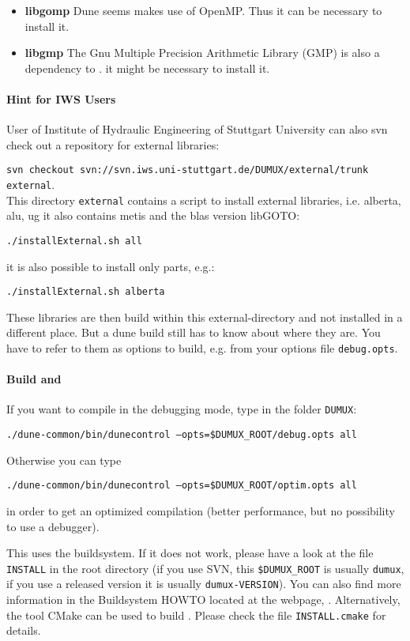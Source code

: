 \begin{itemize}
\item \textbf{libgomp} Dune seems makes use of OpenMP. Thus it can be necessary to install it.

\item \textbf{libgmp} The Gnu Multiple Precision Arithmetic Library (GMP) is also a dependency to \Dune. it might be necessary to install it.

\end{itemize}

\paragraph{Hint for IWS Users} User of Institute of Hydraulic Engineering of Stuttgart University 
can also svn check out a repository for external libraries: 

\texttt{svn checkout svn://svn.iws.uni-stuttgart.de/DUMUX/external/trunk external}. \\

This directory \texttt{external} contains a script to install external libraries, i.e. 
alberta, alu, ug it also contains metis and the blas version libGOTO: 
\begin{center}
\texttt{./installExternal.sh all}
\end{center}
it is also possible to install only parts, e.g.:\\ 
\begin{center}
\texttt{./installExternal.sh alberta}
\end{center}

These libraries are then build within this external-directory and not installed in 
a different place. But a dune build still  has to know about where they are.
You have to refer to them as options to \Dune build, e.g. from your options file \texttt{debug.opts}.


\paragraph{Build \Dune and \Dumux}
\label{buildIt}
If you want to compile in the debugging mode, type in the folder \texttt{DUMUX}: 
\begin{center}
\texttt{./dune-common/bin/dunecontrol --opts=\$DUMUX\_ROOT/debug.opts all}
\end{center}

Otherwise you can type
\begin{center}
\texttt{./dune-common/bin/dunecontrol --opts=\$DUMUX\_ROOT/optim.opts all}
\end{center}
in order to get an optimized compilation (better performance, but no possibility to use a debugger).

This uses the \Dune buildsystem. If it does not work, please have a look at the file \texttt{INSTALL} in the \Dumux root directory (if you use SVN, this \texttt{\$DUMUX\_ROOT} is usually \texttt{dumux}, if you use a released version it is usually \texttt{dumux-VERSION}). You can also find more information in the \Dune Buildsystem HOWTO located at the \Dune webpage, \cite{DUNE-HP}.  Alternatively, the tool CMake can be used to build \Dumux. Please check the file \texttt{INSTALL.cmake} for details.
